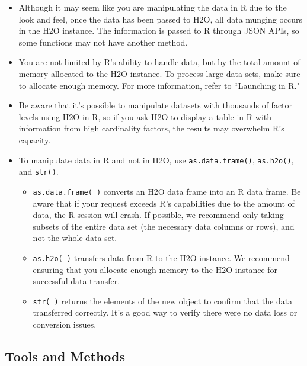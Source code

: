 \documentclass[11pt]{article}
\begin{document}
{\begin{itemize}
\item Although it may seem like you are manipulating the data in R due to the look and feel, once the data has been passed to H2O, all data munging occurs in the H2O instance. The information is passed to R through JSON APIs, so some functions may not have another method. 
\item You are not limited by R's ability to handle data, but by the total amount of memory allocated to the H2O instance. To process large data sets, make sure to allocate enough memory. For more information, refer to ``Launching in R." 
\item Be aware that it’s possible to manipulate datasets with thousands of factor levels using H2O in R, so if you ask H2O to display a table in R with information from high cardinality factors, the results may overwhelm R's capacity. 
\item To manipulate data in R and not in H2O, use {\texttt{as.data.frame()}}, {\texttt{as.h2o()}}, and {\texttt{str()}}. \begin{itemize}
\item {\texttt{as.data.frame( )}} converts an H2O data frame into an R data frame. Be aware that if your request exceeds R’s capabilities due to the amount of data, the R session will crash. If possible, we recommend only taking subsets of the entire data set (the necessary data columns or rows), and not the whole data set. 
\item {\texttt{as.h2o( )}} transfers data from R to the H2O instance. We recommend ensuring that you allocate enough memory to the H2O instance for successful data transfer.
\item {\texttt{str( )}} returns the elements of the new object to confirm that the data transferred correctly. It’s a good way to verify there were no data loss or conversion issues. 
\end{itemize}
\end{itemize}

\subsection{Tools and Methods}

}
\end{document}
